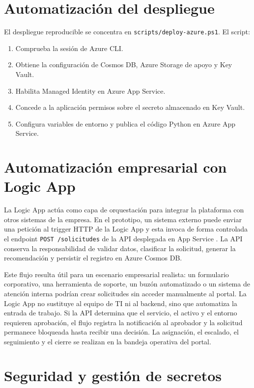 \section{Automatización del despliegue}

El despliegue reproducible se concentra en \texttt{scripts/deploy-azure.ps1}. El script:

\begin{enumerate}
    \item Comprueba la sesión de Azure CLI.
    \item Obtiene la configuración de Cosmos DB, Azure Storage de apoyo y Key Vault.
    \item Habilita Managed Identity en Azure App Service.
    \item Concede a la aplicación permisos sobre el secreto almacenado en Key Vault.
    \item Configura variables de entorno y publica el código Python en Azure App Service.
\end{enumerate}


\section{Automatización empresarial con Logic App}

La Logic App actúa como capa de orquestación para integrar la plataforma con otros sistemas de la empresa. En el prototipo, un sistema externo puede enviar una petición al trigger HTTP de la Logic App y esta invoca de forma controlada el endpoint \texttt{POST /solicitudes} de la API desplegada en App Service \cite{azure_logic_apps_http}. La API conserva la responsabilidad de validar datos, clasificar la solicitud, generar la recomendación y persistir el registro en Azure Cosmos DB.

Este flujo resulta útil para un escenario empresarial realista: un formulario corporativo, una herramienta de soporte, un buzón automatizado o un sistema de atención interna podrían crear solicitudes sin acceder manualmente al portal. La Logic App no sustituye al equipo de TI ni al backend, sino que automatiza la entrada de trabajo. Si la API determina que el servicio, el activo y el entorno requieren aprobación, el flujo registra la notificación al aprobador y la solicitud permanece bloqueada hasta recibir una decisión. La asignación, el escalado, el seguimiento y el cierre se realizan en la bandeja operativa del portal.
\section{Seguridad y gestión de secretos}


